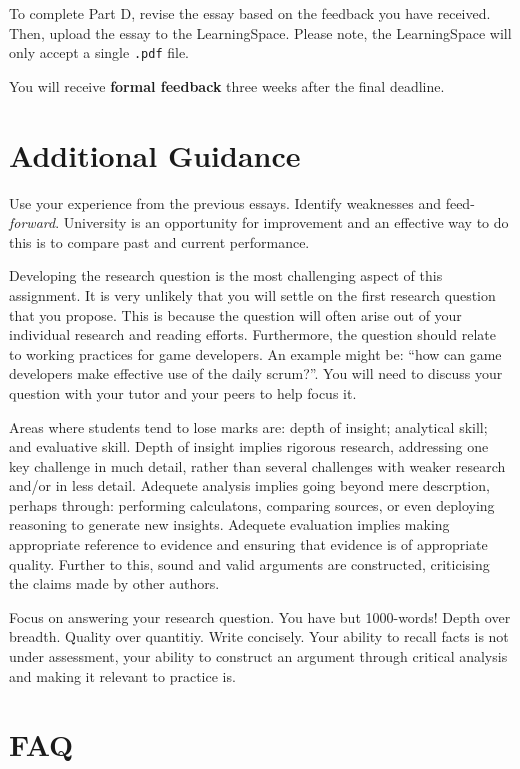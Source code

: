\documentclass{../fal_assignment}
\begin{document}
To complete Part D, revise the essay based on the feedback you have received. Then, upload the essay to the LearningSpace. Please note, the LearningSpace will only accept a single \texttt{.pdf} file.

You will receive \textbf{formal feedback} three weeks after the final deadline.

\section*{Additional Guidance}

Use your experience from the previous essays. Identify weaknesses and feed-\textit{forward}. University is an opportunity for improvement and an effective way to do this is to compare past and current performance.

Developing the research question is the most challenging aspect of this assignment. It is very unlikely that you will settle on the first research question that you propose. This is because the question will often arise out of your individual research and reading efforts. Furthermore, the question should relate to working practices for game developers. An example might be: ``how can game developers make effective use of the daily scrum?''. You will need to discuss your question with your tutor and your peers to help focus it.

Areas where students tend to lose marks are: depth of insight; analytical skill; and evaluative skill. Depth of insight implies rigorous research, addressing one key challenge in much detail, rather than several challenges with weaker research and/or in less detail. Adequete analysis implies going beyond mere descrption, perhaps through: performing calculatons, comparing sources, or even deploying reasoning to generate new insights. Adequete evaluation implies making appropriate reference to evidence and ensuring that evidence is of appropriate quality. Further to this, sound and valid arguments are constructed, criticising the claims made by other authors.

Focus on answering your research question. You have but 1000-words! Depth over breadth. Quality over quantitiy. Write concisely. Your ability to recall facts is not under assessment, your ability to construct an argument through critical analysis and making it relevant to practice is.

\section*{FAQ}
\end{document}
